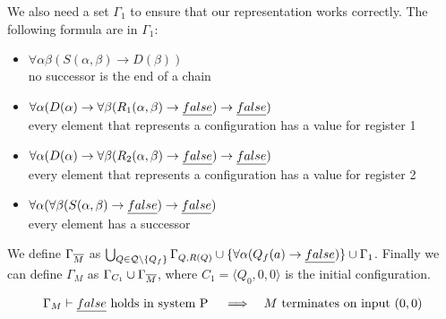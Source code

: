 We also need a set $\Gamma_1$ to ensure that our representation works correctly. The following formula are in $\Gamma_1$:
\begin{itemize}
	\item $\forall\alpha\beta(S(\alpha,\beta)\to D(\beta))$\\no successor is the end of a chain
	\item $\forall\alpha(D(\alpha)\to\forall\beta(R_1(\alpha,\beta)\to\emph{false})\to\emph{false})$\\every element that represents a configuration has a value for register 1
	\item $\forall\alpha(D(\alpha)\to\forall\beta(R_2(\alpha,\beta)\to\emph{false})\to\emph{false})$\\every element that represents a configuration has a value for register 2
	\item $\forall\alpha(\forall\beta(S(\alpha,\beta)\to\emph{false})\to\emph{false})$\\every element has a successor
\end{itemize}
We define $\Gamma_{\overline{M}}$ as $\bigcup_{Q\in\mathcal{Q}\setminus\{Q_f\}}\Gamma_{Q,R(Q)}\cup\{\forall\alpha(Q_f(a)\to\emph{false})\}\cup\Gamma_1$.
Finally we can define $\Gamma_M$ as $\Gamma_{C_1}\cup\Gamma_{\overline{M}}$, where $C_1=\langle Q_0,0,0\rangle$ is the initial configuration.
\begin{claim}\label{cla.17}
	\begin{align*}
		  & \text{$\Gamma_M\vdash\emph{false}$ holds in system P} &   & \implies & \text{$M$ terminates on input $(0,0)$} 
	\end{align*}
\end{claim}
